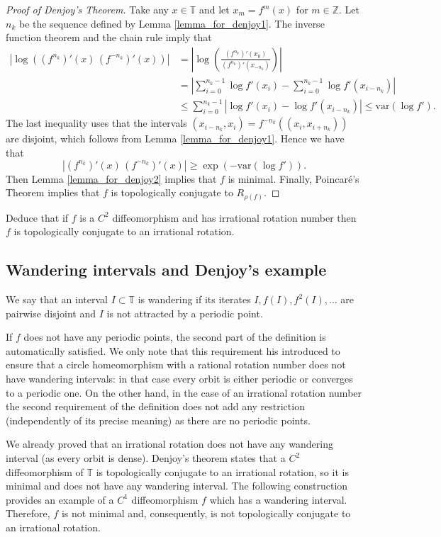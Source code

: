 \documentclass[12pt]{article}
\theoremstyle{definition}
\theoremstyle{remark}
\begin{document}
\begin{proof}[Proof of Denjoy's Theorem]
Take any $x \in \mathbb T$ and let $x_m = f^m(x)$
for $m \in \mathbb Z$. Let $n_k$ be the sequence defined by Lemma \ref{lemma_for_denjoy1}. 
The inverse
function theorem and the chain rule imply that
\begin{align*}
\left|\log\left((f^{n_k})'(x) \, (f^{-n_k})'(x)\right)\right|
&=
\left|\log\left(\frac{(f^{n_k})'(x_0)}{(f^{n_k})'(x_{-n_k})}\right)\right| \\
&=
\left|\sum_{i=0}^{n_k -1} \log f'(x_i)
- \sum_{i=0}^{n_k -1} \log f'(x_{i-n_k})\right| \\
&\le \sum_{i=0}^{n_k-1} |\log f'(x_i) - \log f'(x_{i-n_k})|
\le \mathrm{var}(\log f').
\end{align*}
The last inequality uses that the intervals
$(x_{i-n_k},x_i) = f^{-n_k}((x_i,x_{i+n_k}))$ are disjoint, which follows from Lemma 
\ref{lemma_for_denjoy1}. Hence we have that
\[
|(f^{n_k})'(x) \, (f^{-n_k})'(x) |\ge \exp(-\mathrm{var}(\log f')).
\]
Then Lemma \ref{lemma_for_denjoy2} implies that $f$ is minimal. Finally, Poincar\'e's Theorem implies that $f$ is topologically conjugate to $R_{\rho(f)}$.
\end{proof}

\noindent
Deduce that if $f$ is a $C^2$ diffeomorphism
and has irrational rotation number then $f$ is topologically conjugate to an irrational rotation.


\subsection{Wandering intervals and Denjoy's example}
We say that an interval $I \subset \mathbb T$ is wandering if its iterates 
$I, f(I), f^2(I), \ldots$
are pairwise disjoint and $I$
is not attracted by a periodic point.

If $f$ does not have any periodic points, the second part of the definition is
automatically satisfied. We only note that this requirement his introduced
to ensure that a circle homeomorphism with a rational rotation number does
not have wandering intervals: in that case every orbit is either periodic or
converges to a periodic one. On the other hand, in the case of an irrational
rotation number the second requirement of the definition does not add any
restriction (independently of its precise meaning) as there are no periodic
points.

We already proved that an irrational rotation does not have any wandering
interval (as every orbit is dense). Denjoy's theorem states that a $C^2$
diffeomorphism of $\mathbb T$ is topologically conjugate to an irrational rotation, so
it is minimal and does not have any wandering interval.
The following construction provides an example of a $C^1$ diffeomorphism $f$
which has a wandering interval. Therefore, $f$ is not minimal and, consequently,
is not topologically conjugate to an irrational rotation.
\end{document}
